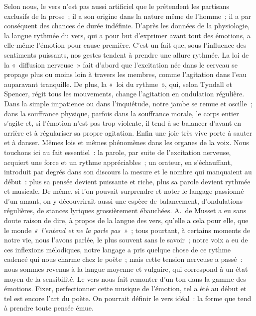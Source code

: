 \documentclass[french,twoside]{book} %
\begin{document}
Selon nous, le vers n’est pas aussi artificiel que le prétendent les partisans exclusifs de la prose ; il a son origine dans la nature même de l’homme ; il a par conséquent des chances de durée indéfinie. D’après les données de la physiologie, la langue rythmée du vers, qui a pour but d’exprimer avant tout des émotions, a elle-même l’émotion pour cause première. C’est un fait que, sous l’influence des sentiments puissants, nos gestes tendent à prendre une allure rythmée. La loi de la « diffusion nerveuse » fait d’abord que l’excitation née dans le cerveau se propage plus ou moins loin à travers les membres, comme l’agitation dans l’eau auparavant tranquille. De plus, la « loi du rythme », qui, selon Tyndall et Spencer, régit tous les mouvements, change l’agitation en ondulation régulière. Dans la simple impatience ou dans l’inquiétude, notre jambe se remue et oscille ; dans la souffrance physique, parfois dans la souffrance morale, le corps entier s’agite et, si l’émotion n’est pas trop violente, il tend à se balancer d’avant en arrière et à régulariser sa propre agitation. Enfin une joie très vive porte à sauter et à danser. Mêmes lois et mêmes phénomènes dans les organes de la voix. Nous touchons ici au fait essentiel : la parole, par suite de l’excitation nerveuse, acquiert une force et un rythme appréciables ; un orateur, en s’échauffant, introduit par degrés dans son discours la mesure et le nombre qui manquaient au début : plus sa pensée devient puissante et riche,  plus sa parole devient rythmée et musicale. De même, si l’on pouvait surprendre et noter le langage passionné d’un amant, on y découvrirait aussi une espèce de balancement, d’ondulations régulières, de stances lyriques grossièrement ébauchées. A. de Musset a eu sans doute raison de dire, à propos de la langue des vers, qu’elle a cela pour elle, que le monde \emph{« l’entend et ne la parle pas »} ; tous pourtant, à certains moments de notre vie, nous l’avons parlée, le plus souvent sans le savoir ; notre voix a eu de ces inflexions mélodiques, notre langage a pris quelque chose de ce rythme cadencé qui nous charme chez le poète ; mais cette tension nerveuse a passé : nous sommes revenus à la langue moyenne et vulgaire, qui correspond à un état moyen de la sensibilité. Le vers nous fait remonter d’un ton dans la gamme des émotions. Fixer, perfectionner cette musique de l’émotion, tel a été au début et tel est encore l’art du poète. On pourrait définir le vers idéal : la forme que tend à prendre toute pensée émue.\par
\end{document}
